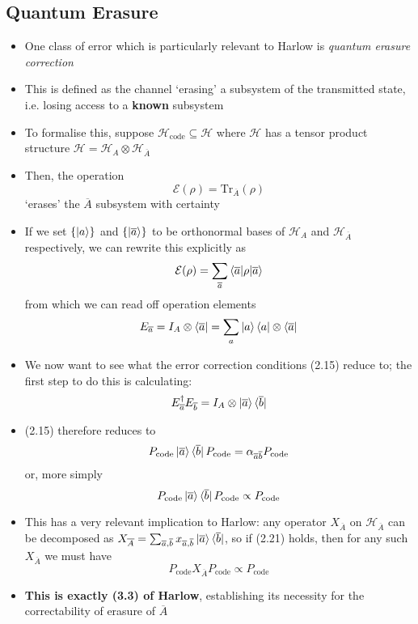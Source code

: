 \documentclass[12pt,a4paper]{article}
\numberwithin{equation}{section}
\newcommand{\ketbra}[2]{\ket{#1}\bra{#2}}
\newcommand{\ketbras}[1]{\ketbra{#1}{#1}}
\newcommand{\Pc}{P_{\text{code}}}
\begin{document}
	\subsection{Quantum Erasure}
	\begin{itemize}
		\item One class of error which is particularly relevant to Harlow is \textit{quantum erasure correction}
		\item This is defined as the channel `erasing' a subsystem of the transmitted state, i.e. losing access to a \textbf{known} subsystem 
		\item To formalise this, suppose $\mathcal{H}_{\text{code}}\subseteq \mathcal{H}$ where $\mathcal{H}$ has a tensor product structure $\mathcal{H}=\mathcal{H}_{A}\otimes\mathcal{H}_{\overline{A}}$
		\item Then, the operation
		\begin{equation}
			\mathcal{E}(\rho)=\text{Tr}_{\overline{A}}(\rho)
		\end{equation}
		`erases' the $\overline{A}$ subsystem with certainty
		\item If we set $\{\ket{a}\}$ and $\{\ket{\overline{a}}\}$ to be orthonormal bases of $\mathcal{H}_{A}$ and $\mathcal{H}_{\overline{A}}$ respectively, we can rewrite this explicitly as
		\begin{equation}
			\mathcal{E}(\rho)=\sum_{\overline{a}}\braket{\overline{a}|\rho|\overline{a}}
		\end{equation}
		from which we can read off operation elements
		\begin{equation}
			E_{\overline{a}}=I_{A}\otimes\bra{\overline{a}}=\sum_{a}\ketbras{a}\otimes\bra{\overline{a}}
		\end{equation}
		\item We now want to see what the error correction conditions (2.15) reduce to; the first step to do this is calculating:
		\begin{equation}
			E_{\overline{a}}^{\dagger}E_{\overline{b}}=I_{A}\otimes\ketbra{\overline{a}}{\overline{b}}
		\end{equation}
		\item (2.15) therefore reduces to
		\begin{equation}
			\Pc\ketbra{\overline{a}}{\overline{b}}\Pc=\alpha_{\overline{a}\overline{b}}\Pc 
		\end{equation}
		or, more simply
		\begin{equation}
			\Pc\ketbra{\overline{a}}{\overline{b}}\Pc\propto\Pc
		\end{equation}
		\item This has a very relevant implication to Harlow: any operator $X_{\overline{A}}$ on $\mathcal{H}_{\overline{A}}$ can be decomposed as $X_{\overline{A}}=\sum_{\overline{a},\overline{b}}x_{\overline{a},\overline{b}}\ketbra{\overline{a}}{\overline{b}}$, so if (2.21) holds, then for any such $X_{\overline{A}}$ we must have
		\begin{equation}
			\Pc X_{\overline{A}}\Pc\propto\Pc
		\end{equation}
		\item \textbf{This is exactly (3.3) of Harlow}, establishing its necessity for the correctability of erasure of $\overline{A}$
	\end{itemize}
\end{document}
